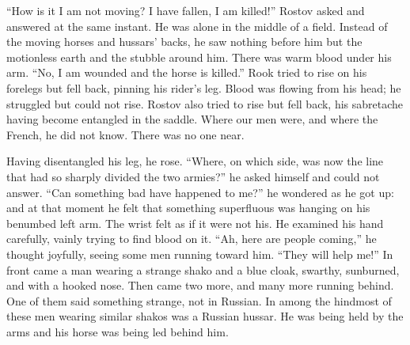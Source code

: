 ``How is it I am not moving? I have fallen, I am killed!'' Rostov
asked and answered at the same instant. He was alone in the
middle of a field.  Instead of the moving horses and hussars'
backs, he saw nothing before him but the motionless earth and the
stubble around him. There was warm blood under his arm. ``No, I
am wounded and the horse is killed.'' Rook tried to rise on his
forelegs but fell back, pinning his rider's leg.  Blood was
flowing from his head; he struggled but could not rise. Rostov
also tried to rise but fell back, his sabretache having become
entangled in the saddle. Where our men were, and where the
French, he did not know. There was no one near.

Having disentangled his leg, he rose. ``Where, on which side, was
now the line that had so sharply divided the two armies?'' he
asked himself and could not answer. ``Can something bad have
happened to me?'' he wondered as he got up: and at that moment he
felt that something superfluous was hanging on his benumbed left
arm. The wrist felt as if it were not his.  He examined his hand
carefully, vainly trying to find blood on it. ``Ah, here are
people coming,'' he thought joyfully, seeing some men running
toward him. ``They will help me!'' In front came a man wearing a
strange shako and a blue cloak, swarthy, sunburned, and with a
hooked nose. Then came two more, and many more running
behind. One of them said something strange, not in Russian. In
among the hindmost of these men wearing similar shakos was a
Russian hussar. He was being held by the arms and his horse was
being led behind him.

